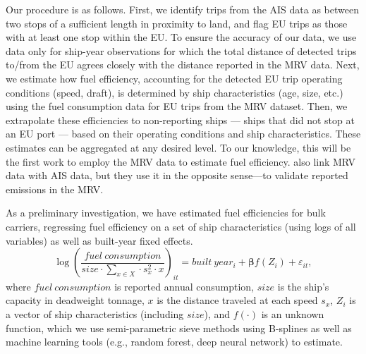 \documentclass[hidelinks, 12pt,letterpaper]{article}
\begin{document}
Our procedure is as follows. First, we identify trips from the AIS data as between two stops of a sufficient length in proximity to land, and flag EU trips as those with at least one stop within the EU. To ensure the accuracy of our data, we use data only for ship-year observations for which the total distance of detected trips to/from the EU agrees closely with the distance reported in the MRV data. %
Next, we estimate how fuel efficiency, accounting for the detected EU trip operating conditions (speed, draft), is determined by ship characteristics (age, size, etc.) using the fuel consumption data for EU trips from the MRV dataset. 
Then, we extrapolate these efficiencies to non-reporting ships --- ships that did not stop at an EU port --- based on their operating conditions and ship characteristics. 
These estimates can be aggregated at any desired level. To our knowledge, this will be the first work to employ the MRV data to estimate fuel efficiency. \citet{uge2020estimation} also link MRV data with AIS data, but they use it in the opposite sense---to validate reported emissions in the MRV.

As a preliminary investigation, we have estimated fuel efficiencies for bulk carriers, regressing fuel efficiency on a set of ship characteristics (using logs of all variables) as well as built-year fixed effects.
 \begin{equation}\label{eq1}
 \log\left(
     \frac{fuel~consumption}{size \cdot \sum_{x \in X}  \cdot s_x^2 \cdot x}
 \right)_{it}
         = built~year_{i} + \boldsymbol{\beta} f(Z_i) + \varepsilon_{it},
 \end{equation}
 where $fuel~consumption$ is reported annual consumption, $size$ is the ship's capacity in deadweight tonnage, $x$ is the distance traveled at each speed $s_x$, $Z_i$ is a vector of ship characteristics (including $size$), and $f(\cdot)$ is an unknown function, which we use semi-parametric sieve methods using B-splines as well as machine learning tools (e.g., random forest, deep neural network) to estimate.
 
\end{document}
